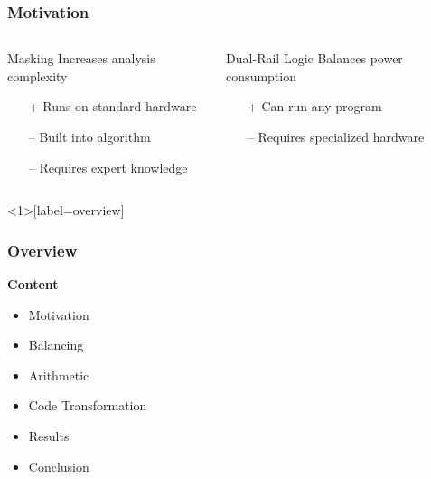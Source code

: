 \documentclass[11pt,t,usepdftitle=false,aspectratio=169]{beamer}
\newcommand{\vq}{\vphantom{q}}
\begin{document}
\begin{frame}
  \frametitle{Motivation}
  \vfill
  \begin{columns}[T]
    \begin{column}{0.48\textwidth}
      \begin{block}{Masking}
        Increases analysis complexity
        \begin{itemize}
        \item[+] Runs on standard hardware
        \item[--\hspace{0.4mm}] Built into algorithm
        \item[--\hspace{0.4mm}] Requires expert knowledge
        \end{itemize}
      \end{block}
    \end{column}
    \begin{column}{0.48\textwidth}
      \begin{block}{Dual-Rail Logic}
        Balances power consumption
        \begin{itemize}
        \item[+] Can run any program
        \item[--\hspace{0.4mm}] Requires specialized hardware
        \item[] \vq
        \end{itemize}
      \end{block}
    \end{column}
  \end{columns}
  \vfill
  \vfill
\end{frame}


\begin{frame}<1>[label=overview]
  \frametitle{Overview}
  \vfill
  \textbf{Content}

  \begin{itemize}
  \item Motivation
  \item \textcolor<2>{uibkorange}{Balancing}
  \item \textcolor<3>{uibkorange}{Arithmetic}
  \item \textcolor<4>{uibkorange}{Code Transformation}
  \item \textcolor<5>{uibkorange}{Results}
  \item \textcolor<6>{uibkorange}{Conclusion}
  \end{itemize}
  \vfill
\end{frame}
\end{document}
